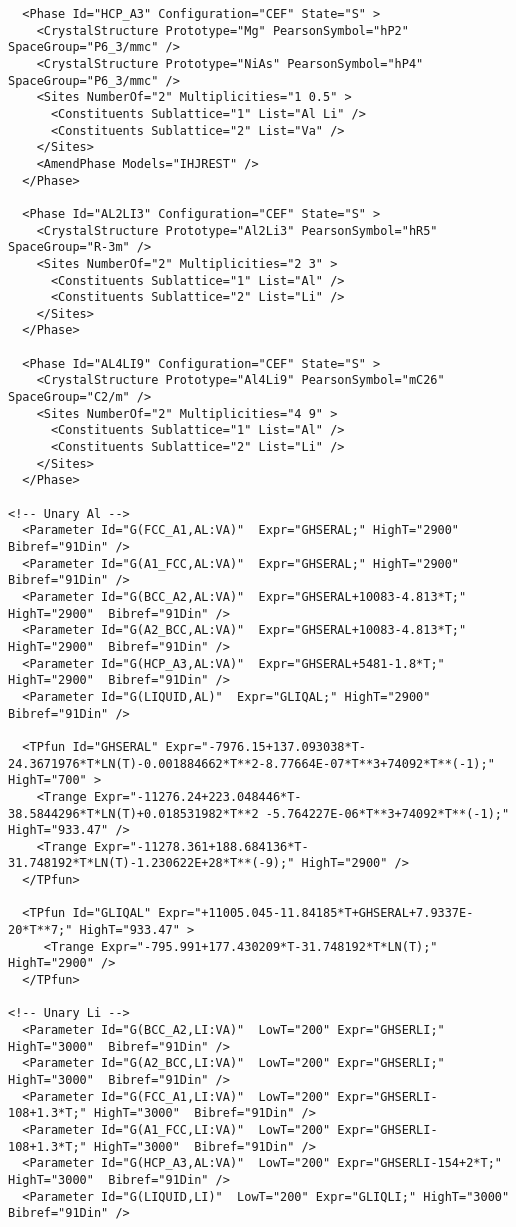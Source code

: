 \documentclass{article}
\begin{document}
\begin{appendices}
\begin{verbatim}
  <Phase Id="HCP_A3" Configuration="CEF" State="S" >
	<CrystalStructure Prototype="Mg" PearsonSymbol="hP2" SpaceGroup="P6_3/mmc" />
	<CrystalStructure Prototype="NiAs" PearsonSymbol="hP4" SpaceGroup="P6_3/mmc" />
    <Sites NumberOf="2" Multiplicities="1 0.5" >
      <Constituents Sublattice="1" List="Al Li" />
      <Constituents Sublattice="2" List="Va" />
    </Sites>
    <AmendPhase Models="IHJREST" />
  </Phase>

  <Phase Id="AL2LI3" Configuration="CEF" State="S" >
	<CrystalStructure Prototype="Al2Li3" PearsonSymbol="hR5" SpaceGroup="R-3m" />
    <Sites NumberOf="2" Multiplicities="2 3" >
      <Constituents Sublattice="1" List="Al" />
      <Constituents Sublattice="2" List="Li" />
    </Sites>
  </Phase>

  <Phase Id="AL4LI9" Configuration="CEF" State="S" >
	<CrystalStructure Prototype="Al4Li9" PearsonSymbol="mC26" SpaceGroup="C2/m" />
    <Sites NumberOf="2" Multiplicities="4 9" >
      <Constituents Sublattice="1" List="Al" />
      <Constituents Sublattice="2" List="Li" />
    </Sites>
  </Phase>

<!-- Unary Al -->
  <Parameter Id="G(FCC_A1,AL:VA)"  Expr="GHSERAL;" HighT="2900"  Bibref="91Din" />
  <Parameter Id="G(A1_FCC,AL:VA)"  Expr="GHSERAL;" HighT="2900"  Bibref="91Din" />
  <Parameter Id="G(BCC_A2,AL:VA)"  Expr="GHSERAL+10083-4.813*T;" HighT="2900"  Bibref="91Din" />
  <Parameter Id="G(A2_BCC,AL:VA)"  Expr="GHSERAL+10083-4.813*T;" HighT="2900"  Bibref="91Din" />
  <Parameter Id="G(HCP_A3,AL:VA)"  Expr="GHSERAL+5481-1.8*T;" HighT="2900"  Bibref="91Din" />
  <Parameter Id="G(LIQUID,AL)"  Expr="GLIQAL;" HighT="2900"  Bibref="91Din" />

  <TPfun Id="GHSERAL" Expr="-7976.15+137.093038*T-24.3671976*T*LN(T)-0.001884662*T**2-8.77664E-07*T**3+74092*T**(-1);" HighT="700" >
    <Trange Expr="-11276.24+223.048446*T-38.5844296*T*LN(T)+0.018531982*T**2 -5.764227E-06*T**3+74092*T**(-1);" HighT="933.47" /> 
    <Trange Expr="-11278.361+188.684136*T-31.748192*T*LN(T)-1.230622E+28*T**(-9);" HighT="2900" /> 
  </TPfun>

  <TPfun Id="GLIQAL" Expr="+11005.045-11.84185*T+GHSERAL+7.9337E-20*T**7;" HighT="933.47" >
     <Trange Expr="-795.991+177.430209*T-31.748192*T*LN(T);" HighT="2900" /> 
  </TPfun>

<!-- Unary Li -->
  <Parameter Id="G(BCC_A2,LI:VA)"  LowT="200" Expr="GHSERLI;" HighT="3000"  Bibref="91Din" />
  <Parameter Id="G(A2_BCC,LI:VA)"  LowT="200" Expr="GHSERLI;" HighT="3000"  Bibref="91Din" />
  <Parameter Id="G(FCC_A1,LI:VA)"  LowT="200" Expr="GHSERLI-108+1.3*T;" HighT="3000"  Bibref="91Din" />
  <Parameter Id="G(A1_FCC,LI:VA)"  LowT="200" Expr="GHSERLI-108+1.3*T;" HighT="3000"  Bibref="91Din" />
  <Parameter Id="G(HCP_A3,AL:VA)"  LowT="200" Expr="GHSERLI-154+2*T;" HighT="3000"  Bibref="91Din" />
  <Parameter Id="G(LIQUID,LI)"  LowT="200" Expr="GLIQLI;" HighT="3000"  Bibref="91Din" />


\end{verbatim}
\end{appendices}
\end{document}
